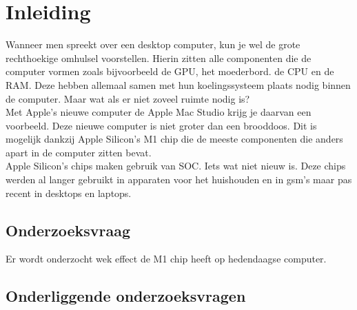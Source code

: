 \documentclass{hogent-article}
\affiliation{
    \textsuperscript{1} \href{mailto:jona.deneve.@student.hogent.be}{jona.deneve.@student.hogent.be}
}
\begin{document}
\flushbottom %
\maketitle %
    \tableofcontents %
\thispagestyle{empty} %


\section{Inleiding}


Wanneer men spreekt over een desktop computer, kun je wel de grote rechthoekige omhulsel voorstellen. Hierin zitten alle componenten die de computer vormen zoals bijvoorbeeld de GPU, het moederbord. de CPU en de RAM. Deze hebben allemaal samen met hun koelingssysteem plaats nodig binnen de computer. Maar wat als er niet zoveel ruimte nodig is? \\
Met Apple's nieuwe computer de Apple Mac Studio krijg je daarvan een voorbeeld. Deze nieuwe computer is niet groter dan een brooddoos. Dit is mogelijk dankzij Apple Silicon's M1 chip die de meeste componenten die anders apart in de computer zitten bevat. \\
Apple Silicon's chips maken gebruik van SOC. Iets wat niet nieuw is. Deze chips werden al langer gebruikt in apparaten voor het huishouden en in gsm's maar pas recent in desktops en laptops.


\subsection{Onderzoeksvraag}

Er wordt onderzocht wek effect de M1 chip heeft op hedendaagse computer.


\subsection{Onderliggende onderzoeksvragen}
\end{document}
